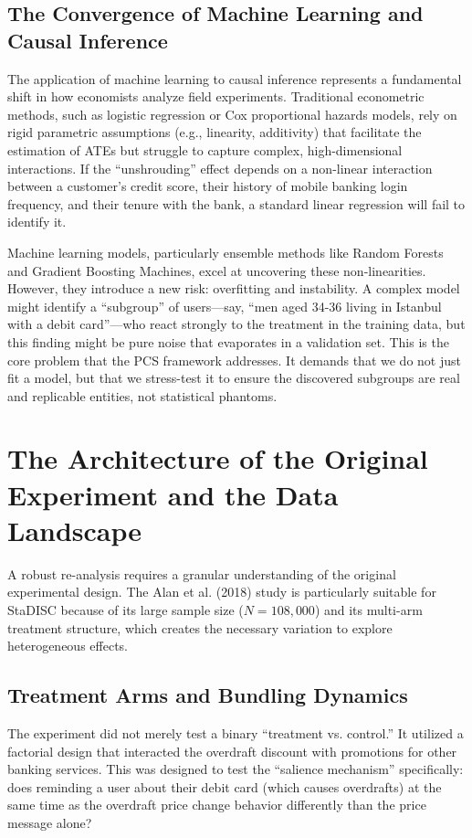 \documentclass[11pt,a4paper]{article}
\begin{document}
	\subsection{The Convergence of Machine Learning and Causal Inference}
	The application of machine learning to causal inference represents a fundamental shift in how economists analyze field experiments. Traditional econometric methods, such as logistic regression or Cox proportional hazards models, rely on rigid parametric assumptions (e.g., linearity, additivity) that facilitate the estimation of ATEs but struggle to capture complex, high-dimensional interactions. If the ``unshrouding'' effect depends on a non-linear interaction between a customer's credit score, their history of mobile banking login frequency, and their tenure with the bank, a standard linear regression will fail to identify it.
	
	Machine learning models, particularly ensemble methods like Random Forests and Gradient Boosting Machines, excel at uncovering these non-linearities. However, they introduce a new risk: overfitting and instability. A complex model might identify a ``subgroup'' of users---say, ``men aged 34-36 living in Istanbul with a debit card''---who react strongly to the treatment in the training data, but this finding might be pure noise that evaporates in a validation set. This is the core problem that the PCS framework addresses. It demands that we do not just fit a model, but that we stress-test it to ensure the discovered subgroups are real and replicable entities, not statistical phantoms.
	
	\section{The Architecture of the Original Experiment and the Data Landscape}
	A robust re-analysis requires a granular understanding of the original experimental design. The Alan et al. (2018) study is particularly suitable for StaDISC because of its large sample size ($N=108,000$) and its multi-arm treatment structure, which creates the necessary variation to explore heterogeneous effects.
	
	\subsection{Treatment Arms and Bundling Dynamics}
	The experiment did not merely test a binary ``treatment vs. control.'' It utilized a factorial design that interacted the overdraft discount with promotions for other banking services. This was designed to test the ``salience mechanism'' specifically: does reminding a user about their debit card (which causes overdrafts) at the same time as the overdraft price change behavior differently than the price message alone?
	
\end{document}
